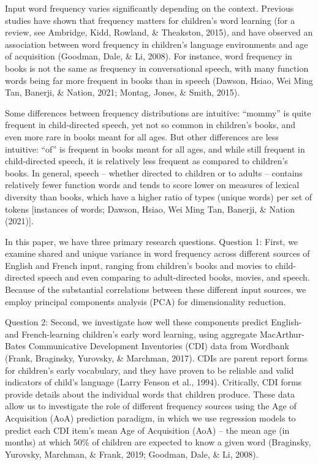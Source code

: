 \documentclass[10pt, letterpaper]{article}
\begin{document}
Input word frequency varies significantly depending on the context.
Previous studies have shown that frequency matters for children's word
learning (for a review, see Ambridge, Kidd, Rowland, \& Theakston,
2015), and have observed an association between word frequency in
children's language environments and age of acquisition (Goodman, Dale,
\& Li, 2008). For instance, word frequency in books is not the same as
frequency in conversational speech, with many function words being far
more frequent in books than in speech (Dawson, Hsiao, Wei Ming Tan,
Banerji, \& Nation, 2021; Montag, Jones, \& Smith, 2015).

Some differences between frequency distributions are intuitive:
``mommy'' is quite frequent in child-directed speech, yet not so common
in children's books, and even more rare in books meant for all ages. But
other differences are less intuitive: ``of'' is frequent in books meant
for all ages, and while still frequent in child-directed speech, it is
relatively less frequent as compared to children's books. In general,
speech -- whether directed to children or to adults -- contains
relatively fewer function words and tends to score lower on measures of
lexical diversity than books, which have a higher ratio of types (unique
words) per set of tokens {[}instances of words; Dawson, Hsiao, Wei Ming
Tan, Banerji, \& Nation (2021){]}.

In this paper, we have three primary research questions. Question 1:
First, we examine shared and unique variance in word frequency across
different sources of English and French input, ranging from children's
books and movies to child-directed speech and even comparing to
adult-directed books, movies, and speech. Because of the substantial
correlations between these different input sources, we employ principal
components analysis (PCA) for dimensionality reduction.

Question 2: Second, we investigate how well these components predict
English- and French-learning children's early word learning, using
aggregate MacArthur-Bates Communicative Development Inventories (CDI)
data from Wordbank (Frank, Braginsky, Yurovsky, \& Marchman, 2017). CDIs
are parent report forms for children's early vocabulary, and they have
proven to be reliable and valid indicators of child's language (Larry
Fenson et al., 1994). Critically, CDI forms provide details about the
individual words that children produce. These data allow us to
investigate the role of different frequency sources using the Age of
Acquisition (AoA) prediction paradigm, in which we use regression models
to predict each CDI item's mean Age of Acquisition (AoA) -- the mean age
(in months) at which 50\% of children are expected to know a given word
(Braginsky, Yurovsky, Marchman, \& Frank, 2019; Goodman, Dale, \& Li,
2008).
\end{document}
